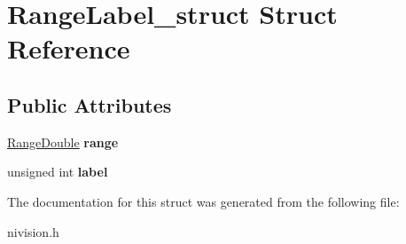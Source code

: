 \hypertarget{structRangeLabel__struct}{
\section{RangeLabel\_\-struct Struct Reference}
\label{structRangeLabel__struct}
}
\subsection*{Public Attributes}
\begin{DoxyCompactItemize}
\item 
\hypertarget{structRangeLabel__struct_a0833c8c76c159534c4838d617023fd16}{
\hyperlink{structRangeDouble__struct}{RangeDouble} {\bfseries range}}
\label{structRangeLabel__struct_a0833c8c76c159534c4838d617023fd16}

\item 
\hypertarget{structRangeLabel__struct_a4a20786f03e1e50a25ae6a60eed39fb7}{
unsigned int {\bfseries label}}
\label{structRangeLabel__struct_a4a20786f03e1e50a25ae6a60eed39fb7}

\end{DoxyCompactItemize}


The documentation for this struct was generated from the following file:\begin{DoxyCompactItemize}
\item 
nivision.h\end{DoxyCompactItemize}
